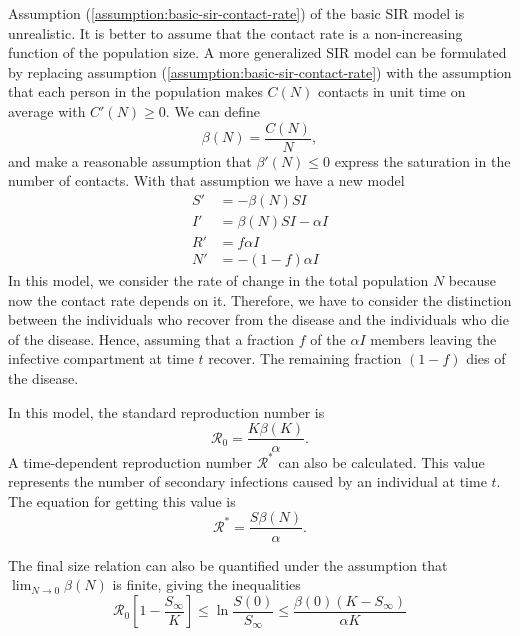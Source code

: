 Assumption (\ref{assumption:basic-sir-contact-rate}) of the basic SIR model is unrealistic.
It is better to assume that the contact rate is a non-increasing function of the population size.
A more generalized SIR model can be formulated by replacing assumption (\ref{assumption:basic-sir-contact-rate}) with the assumption that each person in the population makes $C(N)$ contacts in unit time on average with $C'(N) \geq 0$.
We can define
\begin{equation*}
    \beta(N) = \frac{C(N)}{N},
\end{equation*}
and make a reasonable assumption that $\beta'(N) \leq 0$ express the saturation in the number of contacts.
With that assumption we have a new model
\begin{align*}
    S' &= - \beta(N)SI \\
    I' &= \beta(N)SI - \alpha I \\
    R' &= f \alpha I \\
    N' &= - (1 - f) \alpha I
\end{align*}
In this model, we consider the rate of change in the total population $N$ because now the contact rate depends on it.
Therefore, we have to consider the distinction between the individuals who recover from the disease and the individuals who die of the disease.
Hence, assuming that a fraction $f$ of the $\alpha I$ members leaving the infective compartment at time $t$ recover.
The remaining fraction $(1 - f)$ dies of the disease.

In this model, the standard reproduction number is
\begin{equation}
    \mathcal{R}_0 = \frac{K\beta(K)}{\alpha}.
    \label{eq:generalized-sir-r0}
\end{equation}
A time-dependent reproduction number $\mathcal{R}^*$ can also be calculated.
This value represents the number of secondary infections caused by an individual at time $t$.
The equation for getting this value is
\begin{equation*}
    \mathcal{R}^* = \frac{S\beta(N)}{\alpha}.
\end{equation*}

The final size relation can also be quantified under the assumption that $\lim_{N \to 0} \beta(N)$ is finite, giving the inequalities
\begin{equation*}
    \mathcal{R}_0 \left[ 1 - \frac{S_\infty}{K} \right] \leq \ln\frac{S(0)}{S_\infty} \leq \frac{\beta(0)(K - S_\infty)}{\alpha K}
\end{equation*}

